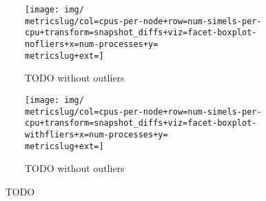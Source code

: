 \begin{figure*}
  \centering
  \begin{subfigure}[b]{0.5\textwidth}
    \centering
    \texttt{[image: img/\\metricslug/col=cpus-per-node+row=num-simels-per-cpu+transform=snapshot\_diffs+viz=facet-boxplot-nofliers+x=num-processes+y=\\metricslug+ext=]}
    \caption{TODO without outliers}
    \label{fig:distribution-\metricslug-nofliers}
  \end{subfigure}%
  \begin{subfigure}[b]{0.5\textwidth}
    \centering
    \texttt{[image: img/\\metricslug/col=cpus-per-node+row=num-simels-per-cpu+transform=snapshot\_diffs+viz=facet-boxplot-withfliers+x=num-processes+y=\\metricslug+ext=]}
    \caption{TODO without outliers}
    \label{fig:distribution-\metricslug-withfliers}
  \end{subfigure}
  \caption{\metric ~ TODO}
  \label{fig:distribution-\metricslug}
\end{figure*}
